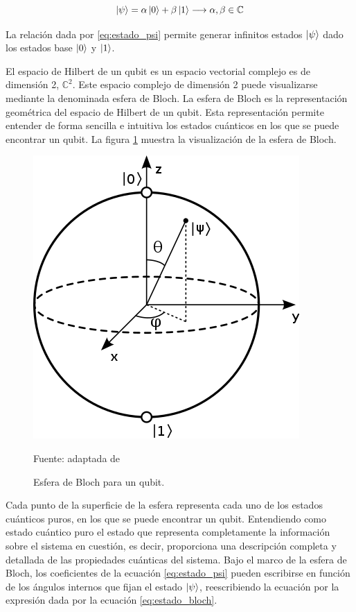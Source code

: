\begin{equation}
    \ket{\psi} = \alpha\ket{0} + \beta\ket{1} \longrightarrow \alpha, \beta \in \mathbb{C}
    \label{eq:estado_psi}
\end{equation}

La relación dada por \ref{eq:estado_psi} permite generar infinitos estados $\ket{\psi}$ dado los estados base $\ket{0}$ y $\ket{1}$.

\newpage

El espacio de Hilbert de un qubit es un espacio vectorial complejo es de dimensión 2, $\mathbb{C}^{2}$. Este espacio complejo de dimensión 2 puede visualizarse mediante la denominada esfera de Bloch. La esfera de Bloch es la representación geométrica del espacio de Hilbert de un qubit. Esta representación permite entender de forma sencilla e intuitiva los estados cuánticos en los que se puede encontrar un qubit. La figura \ref{fig:bloch_sphere} muestra la visualización de la esfera de Bloch.


\begin{figure}[!ht]
    \centering
    \includegraphics[scale = 0.5]{img/03-esfera_bloch.png}
    \caption{Esfera de Bloch para un qubit.}
    Fuente: adaptada de \cite{bloch}
    \label{fig:bloch_sphere}
\end{figure}

Cada punto de la superficie de la esfera representa cada uno de los estados cuánticos puros, en los que se puede encontrar un qubit. Entendiendo como estado cuántico puro el estado que representa completamente la información sobre el sistema en cuestión, es decir, proporciona una descripción completa y detallada de las propiedades cuánticas del sistema. Bajo el marco de la esfera de Bloch, los coeficientes de la ecuación \ref{eq:estado_psi} pueden escribirse en función de los ángulos internos que fijan el estado $\ket{\psi}$, reescribiendo la ecuación por la expresión dada por la ecuación \ref{eq:estado_bloch}.



